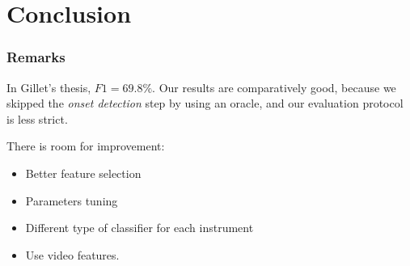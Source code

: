 \documentclass{beamer}
\begin{document}
    \section{Conclusion}
    \begin{frame}
        \frametitle{Remarks}
        In Gillet's thesis, $F1=69.8\%$.
        Our results are comparatively good, because we skipped the \emph{onset detection} step by using an oracle, and our evaluation protocol is less strict.
        \vspace{0.5cm}
        
        There is room for improvement:
        \begin{itemize}
        \item Better feature selection
        \item Parameters tuning
        \item Different type of classifier for each instrument
        \item Use video features.
        \end{itemize}
    \end{frame}
\end{document}
